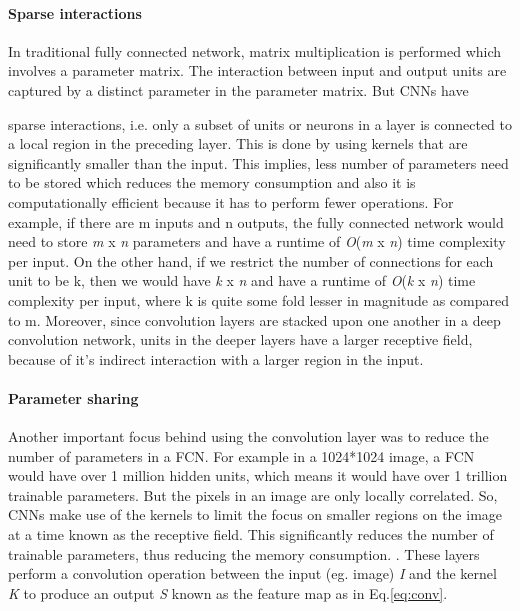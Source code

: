 \paragraph{Sparse interactions}
In traditional fully connected network, matrix multiplication is performed which involves a parameter matrix. The interaction between input and output units are captured by a distinct parameter in the parameter matrix. But \ac{CNN}s have {sparse interactions, i.e. only a subset of units or neurons in a layer is connected to a local region in the preceding layer. This is done by using kernels that are significantly smaller than the input. This implies, less number of parameters need to be stored which reduces the memory consumption and also it is computationally efficient because it has to perform fewer operations. For example, if there are m inputs and n outputs, the fully connected network would need to store \textit{m} x \textit{n} parameters and have a runtime of \textit{O}(\textit{m} x \textit{n}) time complexity per input. On the other hand, if we restrict the number of connections for each unit to be k, then we would have \textit{k} x \textit{n} and have a runtime of \textit{O}(\textit{k} x \textit{n}) time complexity per input, where k is quite some fold lesser in magnitude as compared to m. Moreover, since convolution layers are stacked upon one another in a deep convolution network, units in the deeper layers have a larger receptive field, because of it's indirect interaction with a larger region in the input.
\paragraph{Parameter sharing}
Another important focus behind using the convolution layer was to reduce the number of parameters in a \ac{FCN}. For example in a 1024*1024 image, a \ac{FCN} would have over 1 million hidden units, which means it would have over 1 trillion trainable parameters. But the pixels in an image are only locally correlated. So, \ac{CNN}s make use of the kernels to limit the focus on smaller regions on the image at a time known as the receptive field. This significantly reduces the number of trainable parameters, thus reducing the memory consumption. \cite{ConvNet}.    These layers perform a convolution operation between the input (eg. image) \textit{I} and the kernel \textit{K} to produce an output \textit{S} known as the feature map as in Eq.\ref{eq:conv}.
}
